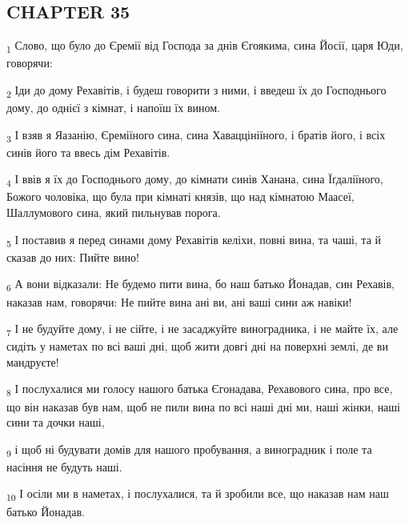 \subsection{CHAPTER 35}
\begin{tcolorbox}
\textsubscript{1} Слово, що було до Єремії від Господа за днів Єгоякима, сина Йосії, царя Юди, говорячи:
\end{tcolorbox}
\begin{tcolorbox}
\textsubscript{2} Іди до дому Рехавітів, і будеш говорити з ними, і введеш їх до Господнього дому, до однієї з кімнат, і напоїш їх вином.
\end{tcolorbox}
\begin{tcolorbox}
\textsubscript{3} І взяв я Яазанію, Єреміїного сина, сина Хаваццініїного, і братів його, і всіх синів його та ввесь дім Рехавітів.
\end{tcolorbox}
\begin{tcolorbox}
\textsubscript{4} І ввів я їх до Господнього дому, до кімнати синів Ханана, сина Їґдаліїного, Божого чоловіка, що була при кімнаті князів, що над кімнатою Маасеї, Шаллумового сина, який пильнував порога.
\end{tcolorbox}
\begin{tcolorbox}
\textsubscript{5} І поставив я перед синами дому Рехавітів келіхи, повні вина, та чаші, та й сказав до них: Пийте вино!
\end{tcolorbox}
\begin{tcolorbox}
\textsubscript{6} А вони відказали: Не будемо пити вина, бо наш батько Йонадав, син Рехавів, наказав нам, говорячи: Не пийте вина ані ви, ані ваші сини аж навіки!
\end{tcolorbox}
\begin{tcolorbox}
\textsubscript{7} І не будуйте дому, і не сійте, і не засаджуйте виноградника, і не майте їх, але сидіть у наметах по всі ваші дні, щоб жити довгі дні на поверхні землі, де ви мандруєте!
\end{tcolorbox}
\begin{tcolorbox}
\textsubscript{8} І послухалися ми голосу нашого батька Єгонадава, Рехавового сина, про все, що він наказав був нам, щоб не пили вина по всі наші дні ми, наші жінки, наші сини та дочки наші,
\end{tcolorbox}
\begin{tcolorbox}
\textsubscript{9} і щоб ні будувати домів для нашого пробування, а виноградник і поле та насіння не будуть наші.
\end{tcolorbox}
\begin{tcolorbox}
\textsubscript{10} І осіли ми в наметах, і послухалися, та й зробили все, що наказав нам наш батько Йонадав.
\end{tcolorbox}
